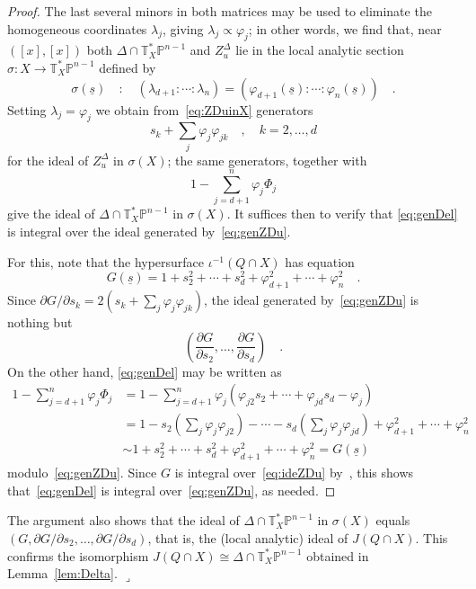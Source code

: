 \documentclass[11pt]{amsart}
\numberwithin{equation}{section}
\newcommand{\Pbb}{{\mathbb{P}}}
\newcommand{\Tbb}{{\mathbb{T}}}
\newcommand{\us}{\underline s}
\newcommand{\qede}{\hfill$\lrcorner$}
\begin{document}
\begin{proof}
The last several minors in both matrices may be used to eliminate the homogeneous 
coordinates $\lambda_j$, giving $\lambda_j \propto \varphi_j$; in other words, we
find that, near $([x],[x])$ both $\Delta\cap \Tbb^*_X\Pbb^{n-1}$ and $Z^\Delta_u$ lie 
in the local analytic section $\sigma: X\to\Tbb^*_X\Pbb^{n-1}$ defined by
\[
\sigma(\us)\quad:\quad
(\lambda_{d+1}:\cdots : \lambda_n) = (\varphi_{d+1}(\us):\cdots: \varphi_n(\us))\quad.
\]
Setting $\lambda_j = \varphi_j$ we obtain from~\eqref{eq:ZDuinX} generators
\begin{equation}\label{eq:genZDu}
s_k +\sum_j \varphi_j \varphi_{jk} \quad,\quad k=2,\dots, d
\end{equation}
for the ideal of $Z^\Delta_u$ in $\sigma(X)$; the same generators, together with
\begin{equation}\label{eq:genDel}
1-\sum_{j=d+1}^n \varphi_j \Phi_j
\end{equation}
give the ideal of $\Delta\cap \Tbb^*_X\Pbb^{n-1}$ in $\sigma(X)$.
It suffices then to verify that \eqref{eq:genDel} is integral over the ideal generated 
by~\eqref{eq:genZDu}.

For this, note that the hypersurface $\iota^{-1}(Q\cap X)$ has equation
\[
G(\us) = 1+s_2^2+\cdots + s_d^2 + \varphi_{d+1}^2+\cdots + \varphi_n^2\quad.
\]
Since $\partial G/\partial s_k=2(s_k + \sum_j \varphi_j \varphi_{jk})$,
the ideal generated by~\eqref{eq:genZDu} is nothing but
\begin{equation}\label{eq:ideZDu}
\left(\frac{\partial G}{\partial s_2},\dots, \frac{\partial G}{\partial s_d} \right)\quad.
\end{equation}
On the other hand, \eqref{eq:genDel} may be written as
\begin{align*}
1-\sum_{j=d+1}^n \varphi_j \Phi_j &=
1-\sum_{j=d+1}^n \varphi_j (\varphi_{j2}s_2 + \cdots + \varphi_{jd} s_d - \varphi_j) \\
&=1-s_2 \left(\sum_j \varphi_j \varphi_{j2}\right) - \cdots -s_d \left(\sum_j \varphi_j \varphi_{jd} \right)
+\varphi_{d+1}^2+\cdots + \varphi_n^2 \\
&\sim 1+s_2^2 +\cdots + s_d^2 +\varphi_{d+1}^2+\cdots + \varphi_n^2 = G(\us)
\end{align*}
modulo~\eqref{eq:genZDu}. Since
$G$ is integral over~\eqref{eq:ideZDu} by~\cite[Corollary~7.2.6]{MR2266432},
this shows that~\eqref{eq:genDel} is integral over~\eqref{eq:genZDu}, as needed.
\end{proof}

\begin{remark}
The argument also shows that the ideal of $\Delta\cap
\Tbb^*_X\Pbb^{n-1}$ in $\sigma(X)$ equals $(G,\partial G/\partial s_2,\dots, \partial G/\partial s_d)$,
that is, the (local analytic) ideal of $J(Q\cap X)$. This confirms the isomorphism
$J(Q\cap X)\cong \Delta\cap \Tbb^*_X\Pbb^{n-1}$ obtained in Lemma~\ref{lem:Delta}.
\qede\end{remark}
\end{document}
